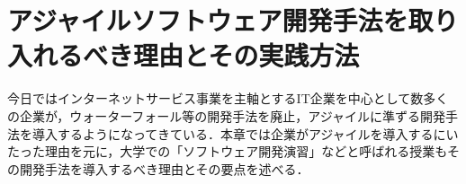 \chapter{アジャイルソフトウェア開発手法を取り入れるべき理由とその実践方法}

今日ではインターネットサービス事業を主軸とするIT企業を中心として数多くの企業が，ウォーターフォール等の開発手法を廃止，アジャイルに準ずる開発手法を導入するようになってきている．本章では企業がアジャイルを導入するにいたった理由を元に，大学での「ソフトウェア開発演習」などと呼ばれる授業もその開発手法を導入するべき理由とその要点を述べる．



